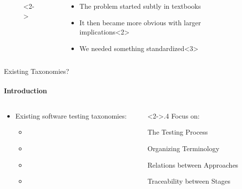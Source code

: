 \documentclass{beamer}
\begin{document}
\begin{frame}
\begin{columns}
\begin{column}{.6\textwidth}
\begin{figure}
{                }<2->
            \end{figure}
        \end{column}
        \begin{column}{.4\textwidth}
            \begin{itemize}
                \item The problem started subtly in textbooks
                \item<2-> It then became more obvious with larger implications\only{\vspace{0.29cm}}<2>
                \item<3-> We needed something standardized\only{\vspace{0.29cm}}<3>
            \end{itemize}
        \end{column}
    \end{columns}
\end{frame}

\begin{frame}{Existing Taxonomies?}
    \framesubtitle{Introduction}
    \begin{columns}[T]
        \begin{column}{.6\textwidth}
            \begin{itemize}
                \item Existing software testing taxonomies:
                      \begin{itemize}
                          \item \citet{TebesEtAl2020a}
                          \item \citet{SouzaEtAl2017}
                          \item \citet{Firesmith2015}
                          \item \citet{UnterkalmsteinerEtAl2014}
                      \end{itemize}
            \end{itemize}
        \end{column}
        \begin{column}<2->{.4\textwidth}
            \centering
            \vspace{1.5mm}
            Focus on:
            \vspace{0.5mm}

            \small The Testing Process

            Organizing Terminology

            Relations between Approaches

            Traceability between Stages
        \end{column}
    \end{columns}
\end{frame}
\end{document}
